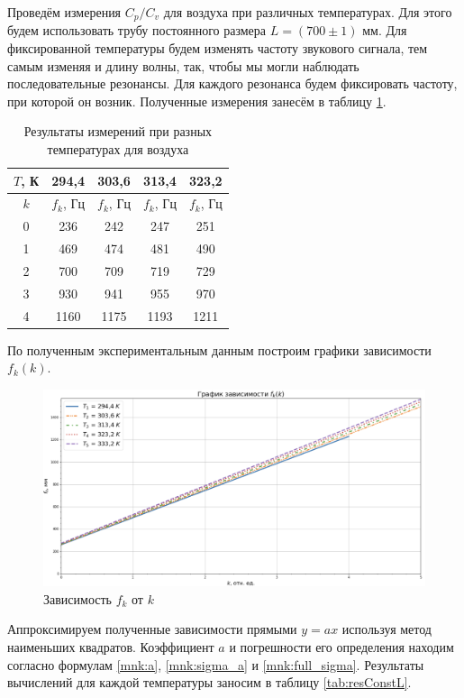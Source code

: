 \documentclass[a4paper,12pt]{article}
\theoremstyle{definition}
\begin{document}
	Проведём измерения $ C_p/C_v $ для воздуха при различных температурах. Для этого будем использовать трубу постоянного размера $ L = (700 \pm 1) $ мм. Для фиксированной температуры будем изменять частоту звукового сигнала, тем самым изменяя и длину волны, так, чтобы мы могли наблюдать последовательные резонансы. Для каждого резонанса будем фиксировать частоту, при которой он возник. Полученные измерения занесём в таблицу \ref{tab:constL}.
	
	\begin{table}[H]
		\centering
		\begin{tabular}{|c|c|c|c|c|}
			\hline
			$ T $, К & 294,4 & 303,6 & 313,4 & 323,2  \\ \hline
			$k$ &  $ f_k $, Гц & $ f_k $, Гц &  $ f_k $, Гц & $ f_k $, Гц \\ \hline
			0 & 236 &242 & 247& 251 \\ \hline
			1 & 469 &474 & 481 &490\\ \hline
			2 & 700 & 709 & 719&729 \\ \hline
			3 & 930 & 941 & 955 &970 \\ \hline
			4 & 1160 & 1175& 1193 &1211 \\ \hline
		\end{tabular}
		\caption{Результаты измерений при разных температурах для воздуха}
		\label{tab:constL}
	\end{table}
	
	По полученным экспериментальным данным построим графики зависимости $ f_k(k) $.
	
	\begin{figure}[h!]
		\centering
		\includegraphics[scale=0.542]{graph2}
		\caption{Зависимость $ f_k $ от $ k $}
		\label{graph}
	\end{figure}

	Аппроксимируем полученные зависимости прямыми $ y=ax $ используя метод наименьших квадратов. Коэффициент $ a $ и погрешности его определения находим согласно формулам \eqref{mnk:a}, \eqref{mnk:sigma_a} и \eqref{mnk:full_sigma}. Результаты вычислений для каждой температуры заносим в таблицу \ref{tab:resConstL}.
	
\end{document}
